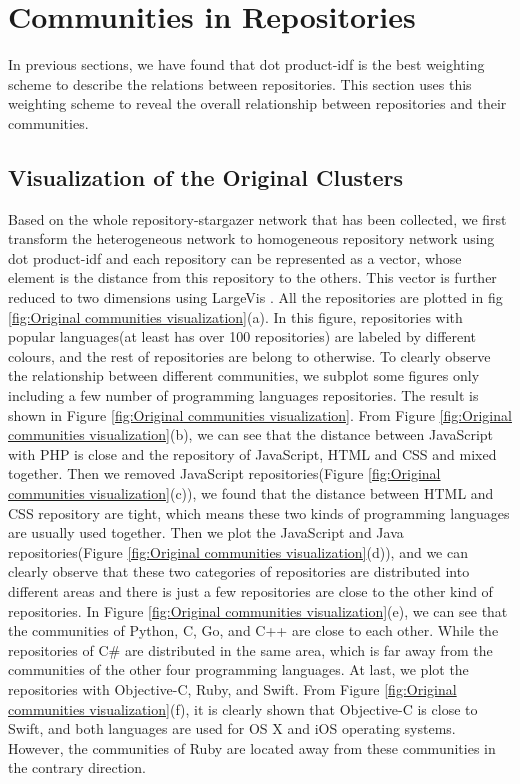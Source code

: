 \documentclass[12pt,oneside,final]{vlsithesis}
\begin{document}
\chapter{Communities in Repositories}\label{chapter:communities in repositories}
In previous sections, we have found that dot product-idf is the best weighting scheme to describe the relations between repositories. This section uses this weighting scheme to reveal the overall relationship between repositories and their communities.   

\section{Visualization of the Original Clusters}
Based on the whole repository-stargazer network that has been collected, we first transform the heterogeneous network to homogeneous repository network using dot product-idf and each repository can be represented as a vector, whose element is the distance from this repository to the others. This vector is further reduced to two dimensions using LargeVis .  All the repositories are plotted in fig \ref{fig:Original communities visualization}(a). In this figure, repositories with popular languages(at least has over 100 repositories) are labeled by different colours, and the rest of repositories are belong to otherwise. To clearly observe the relationship between different communities, we subplot some figures only including a few number of programming languages repositories. The result is shown in Figure \ref{fig:Original communities visualization}. From Figure  \ref{fig:Original communities visualization}(b), we can see that the distance between JavaScript with PHP is close and the repository of JavaScript, HTML and CSS and mixed together. Then we removed JavaScript repositories(Figure  \ref{fig:Original communities visualization}(c)), we found that the distance between HTML and CSS repository are tight, which means these two kinds of programming languages are usually used together.  Then we plot the JavaScript and Java repositories(Figure  \ref{fig:Original communities visualization}(d)), and we can clearly observe that these two categories of repositories are distributed into different areas and there is just a few repositories are close to the other kind of repositories. In Figure  \ref{fig:Original communities visualization}(e), we can see that the communities of Python, C, Go, and C++ are close to each other. While the repositories of C\# are distributed in the same area, which is far away from the communities of the other four programming languages. At last, we plot the repositories with Objective-C, Ruby, and Swift. From Figure  \ref{fig:Original communities visualization}(f), it is clearly shown that Objective-C is close to Swift, and both languages are used for OS X and iOS operating systems. However, the communities of Ruby are located away from these communities in the contrary direction.  
\end{document}

